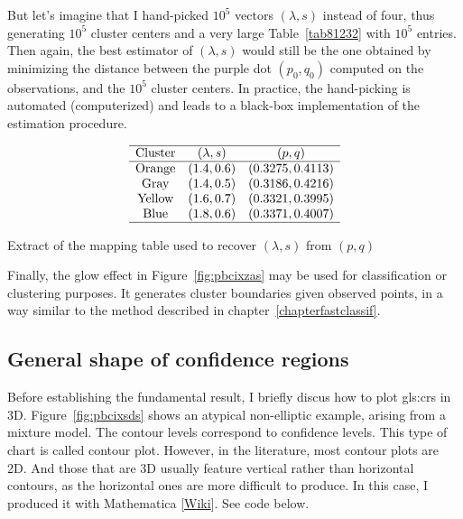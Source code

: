 \documentclass[oneside,10pt]{book}
\begin{document}
But let's imagine that I hand-picked $10^5$ vectors $(\lambda,s)$ instead of four, thus generating $10^5$ cluster centers and a very large Table~\ref{tab81232} with $10^5$ entries. Then again, the best estimator of $(\lambda,s)$ would still  
be the one obtained by minimizing the distance between the purple dot $(p_0,q_0)$ computed on the observations, and the $10^5$ cluster centers. In practice, the hand-picking is automated 
(computerized) and leads to a 
black-box implementation of the estimation procedure. 

\begin{table}[H]
\[
\begin{array}{ccc}
\hline
 \mbox{Cluster} &  (\lambda,  s) & (p, q) \\
\hline
 \mbox{Orange} & (1.4, 0.6) & (0.3275,  0.4113)\\
\mbox{Gray} & (1.4, 0.5) & (0.3186, 0.4216) \\
\mbox{Yellow} & (1.6,  0.7) & (0.3321, 0.3995)\\
\mbox{Blue} & (1.8, 0.6)&  (0.3371,  0.4007)\\
\hline
\end{array}
\]
\caption{\label{tab81232}Extract of the mapping table used to recover $(\lambda,s)$ from $(p,q)$}
\end{table}

\noindent Finally, the glow effect in Figure~\ref{fig:pbcixzas} may be used for classification or clustering purposes. It generates cluster boundaries
 given observed points, in a way similar to the method described in chapter~\ref{chapterfastclassif}.


\subsection{General shape of confidence regions}\label{generi}

Before establishing the fundamental result, I briefly discus how to plot \glspl{gls:cr} in 3D. Figure~\ref{fig:pbcixsds}
 shows an atypical non-elliptic example, arising from a \textcolor{index}{mixture model}. The \textcolor{index}{contour levels} 
correspond to \textcolor{index}{confidence levels}. This type of chart is called \textcolor{index}{contour plot}. However, in the 
literature, most contour plots are 2D. And those that are 3D usually feature vertical rather than horizontal contours, as the horizontal ones
are more difficult to produce. In this case, I produced it with 
\textcolor{index}{Mathematica} [\href{https://www.wolframalpha.com/}{Wiki}]. See code below.  \\
\end{document}
